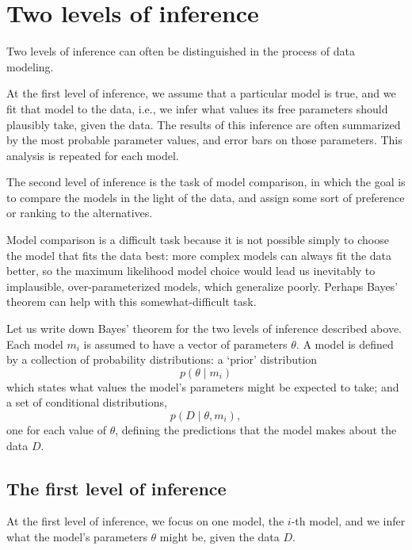 \documentclass[11pt]{article}
\theoremstyle{plain} %
\theoremstyle{remark}
\begin{document}
\begin{center}

  {}
\end{center}
\vspace{2em}

\tableofcontents

\section{Two levels of inference}
Two levels of inference can often be distinguished in the process of data
modeling.

At the first level of inference, we assume that a particular model is true,
and we fit that model to the data, i.e., we infer what values its free
parameters should plausibly take, given the data. The results of this
inference are often summarized by the most probable parameter values, and
error bars on those parameters. This analysis is repeated for each model.

The second level of inference is the task of model comparison, in which the goal
is to compare the models in the light of the data, and assign some sort of
preference or ranking to the alternatives.

Model comparison is a difficult task because it is not possible simply to choose
the model that fits the data best: more complex models can always fit the data
better, so the maximum likelihood model choice would lead us inevitably to
implausible, over-parameterized models, which generalize poorly. Perhaps
Bayes' theorem can help with this somewhat-difficult task.

Let us write down Bayes' theorem for the two levels of inference described
above. Each model $m_{i}$ is assumed to have a vector of parameters $\theta$.
A model is defined by a collection of probability distributions: a `prior'
distribution
$$
  p\left(\theta \mid m_{i}\right)
$$
which states what values the model's parameters might be expected to take; and a
set of conditional distributions,
$$
  p\left(D \mid \theta, m_{i}\right),
$$
one for each value of $\theta$, defining the
predictions that the model makes about the data $D$.

\subsection{The first level of inference}
At the first level of inference, we focus on one model, the $i$-th
model, and we infer what the model's parameters $\theta$ might be, given the
data $D$.
\end{document}
